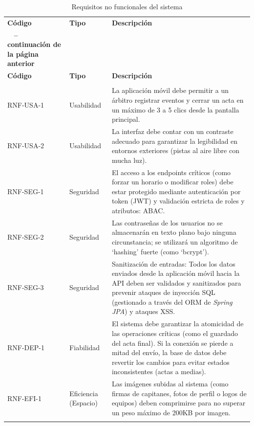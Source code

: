 {\renewcommand{\arraystretch}{1.25}
    \begin{xltabular}{\textwidth}{>{\RaggedRight}p{1.7cm} p{1.8cm} >{\RaggedRight\arraybackslash}X}
        \caption{Requisitos no funcionales del sistema}\label{tab:rnfs}\\
        \lightrule
        \textbf{Código} & \textbf{Tipo} & \textbf{Descripción} \\
        \lightrule
        \endfirsthead
        {{\bfseries \tablename\ \thetable{} -- continuación de la página anterior}} \\
        \lightrule
        \textbf{Código} & \textbf{Tipo} & \textbf{Descripción} \\
        \lightrule
        \endhead
         \\ \lightrule
        \endfoot
        \lightrule
        \endlastfoot
        RNF-USA-1 & Usabilidad & La aplicación móvil debe permitir a un árbitro registrar eventos y cerrar un acta en un máximo de 3 a 5 clics desde la pantalla principal. \\ \lightrule
        RNF-USA-2 & Usabilidad & La interfaz debe contar con un contraste adecuado para garantizar la legibilidad en entornos exteriores (pistas al aire libre con mucha luz). \\ \lightrule
        RNF-SEG-1 & Seguridad & El acceso a los endpoints críticos (como forzar un horario o modificar roles) debe estar protegido mediante autenticación por token (JWT) y validación estricta de roles y atributos: \ac{ABAC}. \\ \lightrule
        RNF-SEG-2 & Seguridad & Las contraseñas de los usuarios no se almacenarán en texto plano bajo ninguna circunstancia; se utilizará un algoritmo de `hashing' fuerte (como `bcrypt'). \\ \lightrule
        RNF-SEG-3 & Seguridad & Sanitización de entradas: Todos los datos enviados desde la aplicación móvil hacia la API deben ser validados y sanitizados para prevenir ataques de inyección SQL (gestionado a través del \ac{ORM} de \emph{Spring JPA}) y ataques \ac{XSS}. \\ \lightrule
        RNF-DEP-1 & Fiabilidad & El sistema debe garantizar la atomicidad de las operaciones críticas (como el guardado del acta final). Si la conexión se pierde a mitad del envío, la base de datos debe revertir los cambios para evitar estados inconsistentes (actas a medias). \\ \lightrule
        RNF-EFI-1 & Eficiencia (Espacio) & Las imágenes subidas al sistema (como firmas de capitanes, fotos de perfil o logos de equipos) deben comprimirse para no superar un peso máximo de 200KB por imagen. \\ \lightrule

\end{xltabular}}
